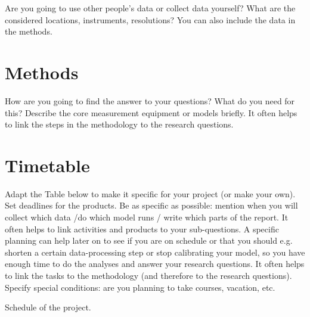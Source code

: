 \documentclass[twocolumn, 10pt, a4paper]{article}
\begin{document}
	Are you going to use other people's data or collect data yourself? What are the considered locations, instruments, resolutions? You can also include the data in the methods.
	
	\section{Methods}
	
	How are you going to find the answer to your questions? What do you need for this? Describe the core measurement equipment or models briefly. It often helps to link the steps in the methodology to the research questions.
	
	
	\section{Timetable}
	
	Adapt the Table below to make it specific for your project (or make your own). Set deadlines for the products. Be as specific as possible: mention when you will collect which data /do which model runs / write which parts of the report. It often helps to link activities and products to your sub-questions. A specific planning can help later on to see if you are on schedule or that you should e.g. shorten a certain data-processing step or stop calibrating your model, so you have enough time to do the analyses and answer your research questions. It often helps to link the tasks to the methodology (and therefore to the research questions). Specify special conditions: are you planning to take courses, vacation, etc. 
	
	
	\begin{table*}[t]
		\caption{Schedule of the project.}
		\label{tab:schedule}
	\end{table*}
	
	
	
	
	
	\renewcommand{\bibname}{Bibliography} 
	
	
	
	
	
	
	
	
\end{document}
